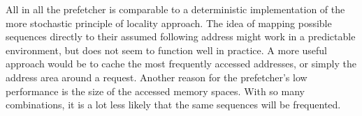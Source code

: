 All in all the prefetcher is comparable to a deterministic implementation of the more stochastic principle of locality approach. The idea of mapping possible sequences directly to their assumed following address might work in a predictable environment, but does not seem to function well in practice. A more useful approach would be to cache the most frequently accessed addresses, or simply the address area around a request. Another reason for the prefetcher's low performance is the size of the accessed memory spaces. With so many combinations, it is a lot less likely that the same sequences will be frequented.